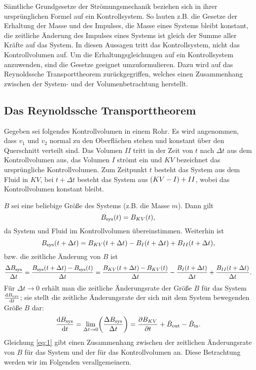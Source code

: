 \documentclass{lecture}
\begin{document}
    Sämtliche Grundgesetze der Strömungsmechanik beziehen sich in ihrer ursprünglichen Formel auf ein Kontrollsystem.
    So lauten z.B. die Gesetze der Erhaltung der Masse und des Impulses, die Masse eines Systems bleibt konstant, die zeitliche Änderung des Impulses eines Systems ist gleich der Summe aller Kräfte auf das System.
    In diesen Aussagen tritt das Kontrollsystem, nicht das Kontrollvolumen auf.
    Um die Erhaltungsgleichungen auf ein Kontrollsystem anzuwenden, sind die Gesetze geeignet umzuformulieren.
    Dazu wird auf das Reynoldssche Transporttheorem zurückgegriffen, welches einen Zusammenhang zwischen der System- und der Volumenbetrachtung herstellt.


    \subsection*{Das Reynoldssche Transporttheorem}

    Gegeben sei folgendes Kontrollvolumen in einem Rohr.
    Es wird angenommen, dass \(v_1\) und \(v_2\) normal zu den Oberflächen stehen und konstant über den Querschnitt verteilt sind.
    Das Volumen \(II\) tritt in der Zeit von \(t\) nach \(\Delta t\) aus dem Kontrollvolumen aus, das Volumen \(I\) strömt ein und \(KV\) bezeichnet das ursprüngliche Kontrollvolumen.
    Zum Zeitpunkt \(t\) besteht das System aus dem Fluid in \(KV\), bei \(t + \Delta t\) besteht das System aus \(\parentheses*{KV - I} + II\), wobei das Kontrollvolumen konstant bleibt.

    \(B\) sei eine beliebige Größe des Systems (z.B. die Masse \(m\)).
    Dann gilt
    \[
        B_{\text{sys}}\parentheses*{t} = B_{KV}\parentheses*{t},
    \]
    da System und Fluid im Kontrollvolumen übereinstimmen.
    Weiterhin ist
    \[
        B_{\text{sys}}\parentheses*{t + \Delta t} = B_{KV}\parentheses*{t + \Delta t} - B_I\parentheses*{t + \Delta t} + B_{II}\parentheses*{t + \Delta t},
    \]
    bzw. die zeitliche Änderung von \(B\) ist
    \[
        \frac{\Delta B_{\text{sys}}}{\Delta t} = \frac{B_{\text{sys}}\parentheses*{t + \Delta t} - B_{\text{sys}}\parentheses*{t}}{\Delta t} = \frac{B_{KV}\parentheses*{t + \Delta t} - B_{KV}\parentheses*{t}}{\Delta t} - \frac{B_I\parentheses*{t + \Delta t}}{\Delta t} + \frac{B_{II}\parentheses*{t + \Delta t}}{\Delta t}.
    \]
    Für \(\Delta t \to 0\) erhält man die zeitliche Änderungsrate der Größe \(B\) für das System \(\frac{\d B_{\text{sys}}}{\d t}\); sie stellt die zeitliche Änderungsrate der sich mit dem System bewegenden Größe \(B\) dar:
    \begin{equation}\label{eq:1}
        \frac{\d B_{\text{sys}}}{\d t} = \lim_{\Delta t \to 0}\parentheses*{\frac{\Delta B_{\text{sys}}}{\Delta t}} = \frac{\partial B_{KV}}{\partial t} + \dot{B}_{\text{out}} - \dot{B}_{\text{in}}.
    \end{equation}
    Gleichung \eqref{eq:1} gibt einen Zusammenhang zwischen der zeitlichen Änderungsrate von \(B\) für das System und der für das Kontrollvolumen an.
    Diese Betrachtung werden wir im Folgenden verallgemeinern.
\end{document}
